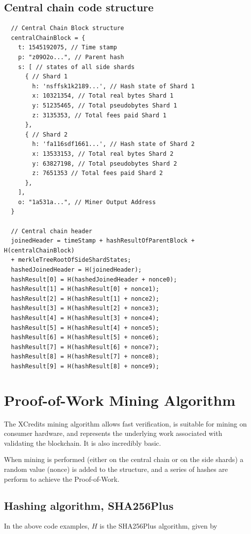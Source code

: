 \documentclass[a4paper,12pt]{article}
\begin{document}
\subsection{Central chain code structure}
\begin{lstlisting}
  // Central Chain Block structure
  centralChainBlock = {
    t: 1545192075, // Time stamp
    p: "z09O2o...", // Parent hash
    s: [ // states of all side shards
      { // Shard 1
        h: 'nsffsk1k2189...', // Hash state of Shard 1
        x: 10321354, // Total real bytes Shard 1
        y: 51235465, // Total pseudobytes Shard 1
        z: 3135353, // Total fees paid Shard 1
      }, 
      { // Shard 2
        h: 'fa116sdf1661...', // Hash state of Shard 2
        x: 13533153, // Total real bytes Shard 2
        y: 63827198, // Total pseudobytes Shard 2
        z: 7651353 // Total fees paid Shard 2
      }, 
    ],
    o: "1a531a...", // Miner Output Address
  }
  
  // Central chain header
  joinedHeader = timeStamp + hashResultOfParentBlock + H(centralChainBlock)
  + merkleTreeRootOfSideShardStates;
  hashedJoinedHeader = H(joinedHeader);
  hashResult[0] = H(hashedJoinedHeader + nonce0);
  hashResult[1] = H(hashResult[0] + nonce1);
  hashResult[2] = H(hashResult[1] + nonce2);
  hashResult[3] = H(hashResult[2] + nonce3);
  hashResult[4] = H(hashResult[3] + nonce4);
  hashResult[5] = H(hashResult[4] + nonce5);
  hashResult[6] = H(hashResult[5] + nonce6);
  hashResult[7] = H(hashResult[6] + nonce7);
  hashResult[8] = H(hashResult[7] + nonce8);
  hashResult[9] = H(hashResult[8] + nonce9);
\end{lstlisting}

\section{Proof-of-Work Mining Algorithm}

The XCredits mining algorithm allows fast verification, is suitable for mining on consumer hardware, and represents the underlying work associated with validating the blockchain. It is also incredibly basic. 

When mining is performed (either on the central chain or on the side shards) a random value (nonce) is added to the structure, and a series of hashes are perform to achieve the Proof-of-Work.

\subsection{Hashing algorithm, SHA256Plus}\label{SHA256Plus}
In the above code examples, $H$ is the SHA256Plus algorithm, given by
\end{document}
